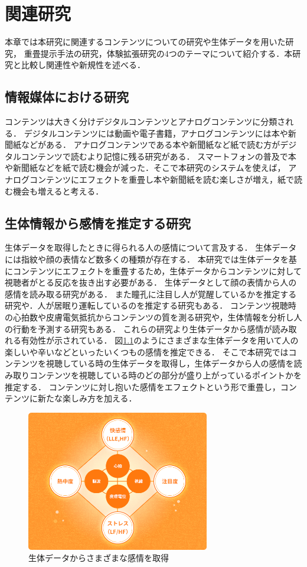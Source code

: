 \thispagestyle{myheadings}
\chapter{関連研究}
本章では本研究に関連するコンテンツについての研究や生体データを用いた研究，
重畳提示手法の研究，体験拡張研究の4つのテーマについて紹介する．本研究と比較し関連性や新規性を述べる．



\section{情報媒体における研究}
コンテンツは大きく分けデジタルコンテンツとアナログコンテンツに分類される．
デジタルコンテンツには動画や電子書籍，アナログコンテンツには本や新聞紙などがある．
アナログコンテンツである本や新聞紙など紙で読む方がデジタルコンテンツで読むより記憶に残る研究がある\cite{books}．
スマートフォンの普及で本や新聞紙などを紙で読む機会が減った．そこで本研究のシステムを使えば，
アナログコンテンツにエフェクトを重畳し本や新聞紙を読む楽しさが増え，紙で読む機会も増えると考える．


\section{生体情報から感情を推定する研究}

生体データを取得したときに得られる人の感情について言及する．
生体データには指紋や顔の表情など数多くの種類が存在する．
本研究では生体データを基にコンテンツにエフェクトを重畳するため，生体データからコンテンツに対して視聴者がとる反応を抜き出す必要がある．
生体データとして顔の表情から人の感情を読み取る研究がある\cite{hyoujou,hyoujou2}．
また瞳孔に注目し人が覚醒しているかを推定する研究や．人が居眠り運転しているのを推定する研究もある\cite{doukou}．
コンテンツ視聴時の心拍数や皮膚電気抵抗からコンテンツの質を測る研究\cite{situ}や，生体情報を分析し人の行動を予測する研究\cite{eigo}もある．
これらの研究より生体データから感情が読み取れる有効性が示されている．
図\ref{seitaidata}のようにさまざまな生体データを用いて人の楽しいや辛いなどといったいくつもの感情を推定できる．
そこで本研究ではコンテンツを視聴している時の生体データを取得し，生体データから人の感情を読み取りコンテンツを視聴している時のどの部分が盛り上がっているポイントかを推定する．
コンテンツに対し抱いた感情をエフェクトという形で重畳し，コンテンツに新たな楽しみ方を加える．

\begin{figure}[H]
    \centering
    \includegraphics[width=8cm]{images/chapter2/heart.png}
    \caption{生体データからさまざまな感情を取得\cite{kanjoutaiken}}
    \label{seitaidata}
\end{figure}


